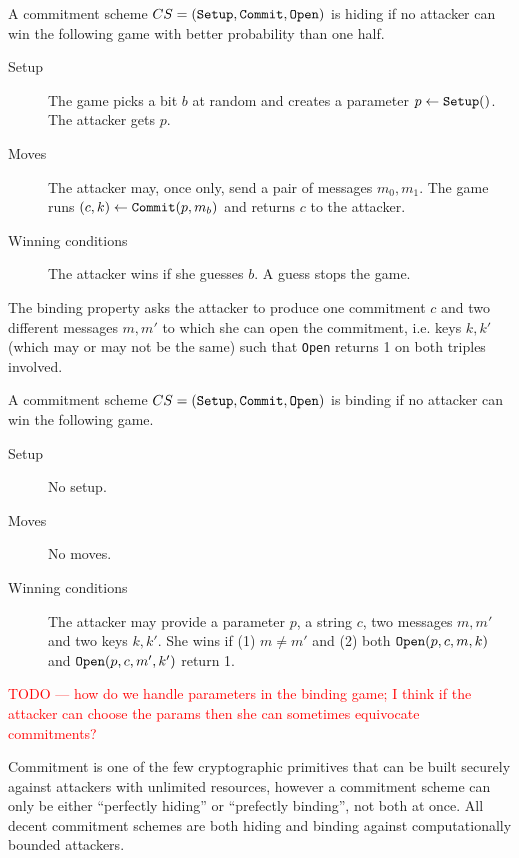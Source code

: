 \documentclass[envcountsame]{llncs}
\newcommand{\alg}[1]{\textup{\texttt{#1}}}
\begin{document}
\begin{definition}
A commitment scheme $CS = (\alg{Setup}, \alg{Commit}, \alg{Open})$ is hiding if
no attacker can win the following game with better probability than one half.

\begin{description}
\item[Setup]
The game picks a bit $b$ at random and creates a parameter $p \gets
\alg{Setup}()$. The attacker gets $p$.

\item[Moves]
The attacker may, once only, send a pair of messages $m_0, m_1$. The game runs
$(c, k) \gets \alg{Commit}(p, m_b)$ and returns $c$ to the attacker.

\item[Winning conditions]
The attacker wins if she guesses $b$. A guess stops the game.
\end{description}
\end{definition}

The binding property asks the attacker to produce one commitment $c$ and two
different messages $m, m'$ to which she can open the commitment, i.e. keys
$k, k'$ (which may or may not be the same) such that \alg{Open} returns 1 on
both triples involved.

\begin{definition}
A commitment scheme $CS = (\alg{Setup}, \alg{Commit}, \alg{Open})$ is binding if
no attacker can win the following game.

\begin{description}
\item[Setup]
No setup.

\item[Moves]
No moves.

\item[Winning conditions]
The attacker may provide a parameter $p$, a string $c$, two messages $m, m'$ and
two keys $k, k'$. She wins if (1) $m \neq m'$ and (2) both $\alg{Open}(p, c, m,
k)$ and $\alg{Open}(p, c, m', k')$ return 1.
\end{description}
\end{definition}

\textcolor{red}{TODO --- how do we handle parameters in the binding game;
I think if the attacker can choose the params then she can sometimes
equivocate commitments?}

Commitment is one of the few cryptographic primitives that can be built securely
against attackers with unlimited resources, however a commitment scheme can only
be either ``perfectly hiding'' or ``prefectly binding'', not both at once.
All decent commitment schemes are both hiding and binding against
computationally bounded attackers.
\end{document}
